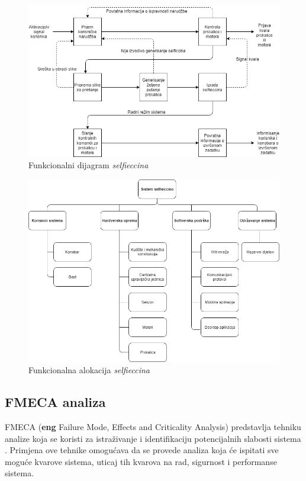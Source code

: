 \documentclass[12pt]{article}
\begin{document}
\begin{figure}[!h]
\centering
\includegraphics[scale=0.65]{funkcdijagram}
\caption{Funkcionalni dijagram \textit{selfieccina}}
\label{funkcdijagram}
\end{figure}

\newpage

\begin{figure}[!h]
\centering
\includegraphics[scale=0.6]{funkcalokacija}
\caption{Funkcionalna alokacija \textit{selfieccina}}
\label{funkcalokacija}
\end{figure}
 
 \newpage
\subsection{FMECA analiza} 
FMECA (\textbf{eng} Failure Mode, Effects and Criticality Analysis) predstavlja tehniku analize koja se koristi za istra\v{z}ivanje i identifikaciju potencijalnih slabosti sistema \cite{oakes1}. Primjena ove tehnike omogu\'cava da se provede analiza koja \'ce ispitati sve mogu\'ce kvarove sistema, uticaj tih kvarova na rad, sigurnost i performanse sistema.
\end{document}
